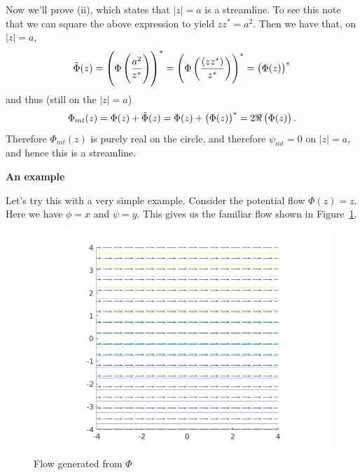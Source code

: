 \documentclass{article}
\def\ti#1{\tilde{#1}}
\begin{document}
Now we'll prove (ii), which states that $|z| = a$ is a streamline. To
see this note that we can square the above expression to yield $z z^* =
a^2$. Then we have that, on $|z| = a$,
%
\begin{equation*}
    \ti\Phi(z)
        = \del{\Phi \del{\frac{a^2}{z^*}}}^*
        = \del{\Phi \del{\frac{(z z^*)}{z^*}}}^*
        = \del{\Phi(z)}^*
\end{equation*}
%
and thus (still on the $|z| = a$)
%
\begin{equation*}
    \Phi_{mt}(z) = \Phi(z) + \ti\Phi(z) = \Phi(z) + \del{\Phi(z)}^* = 2 \Re\del{\Phi(z)}
    .
\end{equation*}
%
Therefore $\Phi_{mt}(z)$ is purely real on the circle, and therefore
$\psi_{mt} = 0$ on $|z| = a$, and hence this is a streamline.

\textbf{An example}

Let's try this with a very simple example. Consider the potential
flow $\Phi(z) = z$. Here we have $\phi = x$ and $\psi = y$. This gives
us the familiar flow shown in Figure~\ref{fig:mt-1}.
%
\begin{figure}[ht]
    \includegraphics[width=35em]{mt_ex1_1}
    \centering
    \caption{Flow generated from $\Phi$}
    \label{fig:mt-1}
\end{figure}
\end{document}
